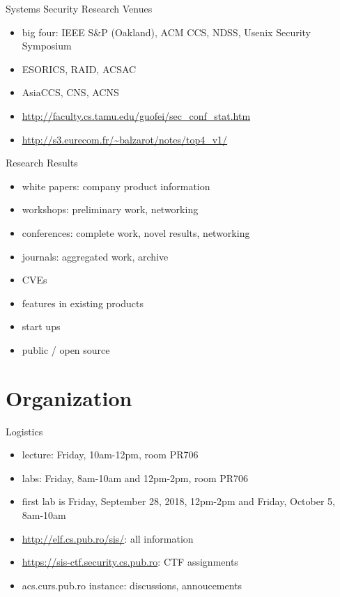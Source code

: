 \documentclass{curs}
\begin{document}
\begin{frame}{Systems Security Research Venues}
  \begin{itemize}
    \pause \item big four: IEEE S\&P (Oakland), ACM CCS, NDSS, Usenix Security Symposium
    \pause \item ESORICS, RAID, ACSAC
    \pause \item AsiaCCS, CNS, ACNS
    \pause \item \url{http://faculty.cs.tamu.edu/guofei/sec_conf_stat.htm}
    \pause \item \url{http://s3.eurecom.fr/~balzarot/notes/top4_v1/}
  \end{itemize}
\end{frame}

\begin{frame}{Research Results}
  \begin{itemize}
    \pause \item white papers: company product information
    \pause \item workshops: preliminary work, networking
    \pause \item conferences: complete work, novel results, networking
    \pause \item journals: aggregated work, archive
    \pause \item CVEs
    \pause \item features in existing products
    \pause \item start ups
    \pause \item public / open source
  \end{itemize}
\end{frame}

\section{Organization}

\begin{frame}{Logistics}
  \begin{itemize}
    \item lecture: Friday, 10am-12pm, room PR706
    \item labs: Friday, 8am-10am and 12pm-2pm, room PR706
    \item first lab is Friday, September 28, 2018, 12pm-2pm and Friday, October 5, 8am-10am
    \item \url{http://elf.cs.pub.ro/sis/}: all information
    \item \url{https://sis-ctf.security.cs.pub.ro}: CTF assignments
    \item acs.curs.pub.ro instance: discussions, annoucements
  \end{itemize}
\end{frame}
\end{document}
